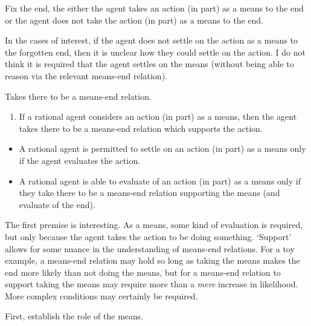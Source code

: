 \documentclass[10pt]{article}
\newcommand{\hozlinedash}[0]{%
  \noindent\hdashrule[0.5ex][c]{\textwidth}{.1pt}{2.5pt}
}
\begin{document}
Fix the end, the either the agent takes an action (in part) as a means to the end or the agent does not take the action (in part) as a means to the end.

In the cases of interest, if the agent does not settle on the action as a means to the forgotten end, then it is unclear how they could settle on the action.
I do not think it is required that the agent settles on the means (without being able to reason via the relevant means-end relation).


\hozlinedash

Takes there to be a means-end relation.

\begin{enumerate}
\item If a rational agent considers an action (in part) as a means, then the agent takes there to be a means-end relation which supports the action.
\end{enumerate}

\begin{itemize}
\item A rational agent is permitted to settle on an action (in part) as a means only if the agent evaluates the action.
\item A rational agent is able to evaluate of an action (in part) as a means only if they take there to be a means-end relation supporting the means (and evaluate of the end).
\end{itemize}


The first premise is interesting.
As a means, some kind of evaluation is required, but only because the agent takes the action to be doing something.
`Support' allows for some nuance in the understanding of means-end relations.
For a toy example, a means-end relation may hold so long as taking the means makes the end more likely than not doing the means, but for a means-end relation to support taking the means may require more than a \emph{mere} increase in likelihood.
More complex conditions may certainly be required.



\hozlinedash

First, establish the role of the means.
\end{document}

